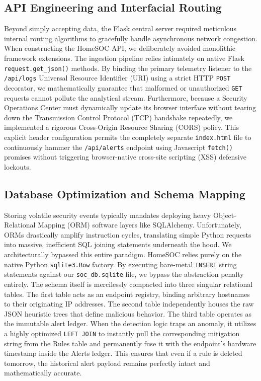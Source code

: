 \documentclass[conference]{IEEEtran}
\begin{document}
\subsection{API Engineering and Interfacial Routing}
Beyond simply accepting data, the Flask central server required meticulous internal routing algorithms to gracefully handle asynchronous network congestion. When constructing the HomeSOC API, we deliberately avoided monolithic framework extensions. The ingestion pipeline relies intimately on native Flask \verb|request.get_json()| methods. By binding the primary telemetry listener to the \verb|/api/logs| Universal Resource Identifier (URI) using a strict HTTP \verb|POST| decorator, we mathematically guarantee that malformed or unauthorized \verb|GET| requests cannot pollute the analytical stream. Furthermore, because a Security Operations Center must dynamically update its browser interface without tearing down the Transmission Control Protocol (TCP) handshake repeatedly, we implemented a rigorous Cross-Origin Resource Sharing (CORS) policy. This explicit header configuration permits the completely separate \verb|index.html| file to continuously hammer the \verb|/api/alerts| endpoint using Javascript \verb|fetch()| promises without triggering browser-native cross-site scripting (XSS) defensive lockouts.

\subsection{Database Optimization and Schema Mapping}
Storing volatile security events typically mandates deploying heavy Object-Relational Mapping (ORM) software layers like SQLAlchemy. Unfortunately, ORMs drastically amplify instruction cycles, translating simple Python requests into massive, inefficient SQL joining statements underneath the hood. We architecturally bypassed this entire paradigm. HomeSOC relies purely on the native Python \verb|sqlite3.Row| factory. By executing bare-metal \verb|INSERT| string statements against our \verb|soc_db.sqlite| file, we bypass the abstraction penalty entirely. The schema itself is mercilessly compacted into three singular relational tables. The first table acts as an endpoint registry, binding arbitrary hostnames to their originating IP addresses. The second table independently houses the raw JSON heuristic trees that define malicious behavior. The third table operates as the immutable alert ledger. When the detection logic traps an anomaly, it utilizes a highly optimized \verb|LEFT JOIN| to instantly pull the corresponding mitigation string from the Rules table and permanently fuse it with the endpoint's hardware timestamp inside the Alerts ledger. This ensures that even if a rule is deleted tomorrow, the historical alert payload remains perfectly intact and mathematically accurate.
\end{document}
